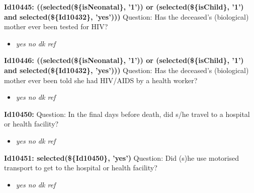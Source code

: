 \documentclass{article}%
\begin{document}
\textbf{Id10445: ((selected(\$\{isNeonatal\}, '1')) or (selected(\$\{isChild\}, '1') and selected(\$\{Id10432\}, 'yes')))\newline%
}%
Question: Has the deceased’s (biological) mother ever been tested for HIV?\newline%
%
\begin{itemize}%
\item%
\textit{yes\newline%
 no\newline%
 dk\newline%
 ref\newline%
}%
\end{itemize}%
\textbf{Id10446: ((selected(\$\{isNeonatal\}, '1')) or (selected(\$\{isChild\}, '1') and selected(\$\{Id10432\}, 'yes')))\newline%
}%
Question: Has the deceased’s (biological) mother ever been told she had HIV/AIDS by a health worker?\newline%
%
\begin{itemize}%
\item%
\textit{yes\newline%
 no\newline%
 dk\newline%
 ref\newline%
}%
\end{itemize}%
\textbf{Id10450: \newline%
}%
Question: In the final days before death, did s/he travel to a hospital or health facility?\newline%
%
\begin{itemize}%
\item%
\textit{yes\newline%
 no\newline%
 dk\newline%
 ref\newline%
}%
\end{itemize}%
\textbf{Id10451: selected(\$\{Id10450\}, 'yes')\newline%
}%
Question: Did (s)he use motorised transport to get to the hospital or health facility?\newline%
%
\begin{itemize}%
\item%
\textit{yes\newline%
 no\newline%
 dk\newline%
 ref\newline%
}%
\end{itemize}%
\end{document}
